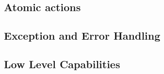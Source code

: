 \subsection{Atomic actions} %
\subsection{Exception and Error Handling} %
\subsection{Low Level Capabilities} %

